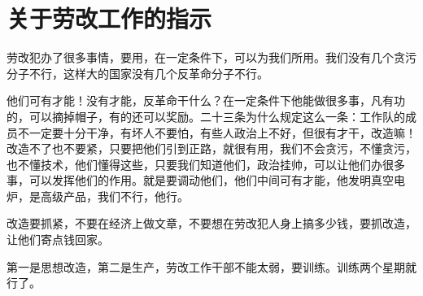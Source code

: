 \section[关于劳改工作的指示（一九六五年四月）]{关于劳改工作的指示}


劳改犯办了很多事情，要用，在一定条件下，可以为我们所用。我们没有几个贪污分子不行，这样大的国家没有几个反革命分子不行。

他们可有才能！没有才能，反革命干什么？在一定条件下他能做很多事，凡有功的，可以摘掉帽子，有的还可以奖励。二十三条为什么规定这么一条：工作队的成员不一定要十分干净，有坏人不要怕，有些人政治上不好，但很有才干，改造嘛！改造不了也不要紧，只要把他们引到正路，就很有用，我们不会贪污，不懂贪污，也不懂技术，他们懂得这些，只要我们知道他们，政治挂帅，可以让他们办很多事，可以发挥他们的作用。就是要调动他们，他们中间可有才能，他发明真空电炉，是高级产品，我们不行，他行。


改造要抓紧，不要在经济上做文章，不要想在劳改犯人身上搞多少钱，要抓改造，让他们寄点钱回家。

第一是思想改造，第二是生产，劳改工作干部不能太弱，要训练。训练两个星期就行了。


